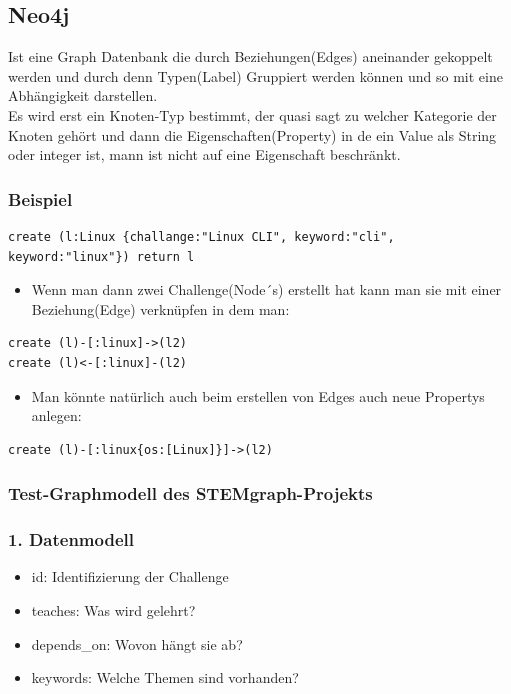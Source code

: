 \subsection{Neo4j}

Ist eine Graph Datenbank die durch Beziehungen(Edges) aneinander gekoppelt werden und durch denn Typen(Label) Gruppiert werden können und so mit eine Abhängigkeit darstellen.
\\
Es wird erst ein Knoten-Typ bestimmt, der quasi sagt zu welcher Kategorie der Knoten gehört und dann die Eigenschaften(Property) in de ein Value als String oder integer ist, mann ist nicht auf eine Eigenschaft beschränkt.

\subsubsection{Beispiel}

\begin{verbatim}
create (l:Linux {challange:"Linux CLI", keyword:"cli", keyword:"linux"}) return l
\end{verbatim}

\begin{itemize}
    \item Wenn man dann zwei Challenge(Node´s) erstellt hat kann man sie mit einer Beziehung(Edge) verknüpfen in dem man:
\end{itemize}

\begin{verbatim}
create (l)-[:linux]->(l2)
create (l)<-[:linux]-(l2)
\end{verbatim}
\begin{itemize}
  \item Man könnte natürlich auch beim erstellen von Edges auch neue Propertys anlegen:
\end{itemize}

\begin{verbatim}
create (l)-[:linux{os:[Linux]}]->(l2)
\end{verbatim}

\subsubsection{Test-Graphmodell des STEMgraph-Projekts}

\subsubsection*{1. Datenmodell}

\begin{itemize}[itemsep=2pt]
  \item id: Identifizierung der Challenge
  \item teaches: Was wird gelehrt?
  \item depends\_on: Wovon hängt sie ab?
  \item keywords: Welche Themen sind vorhanden?
\end{itemize}


